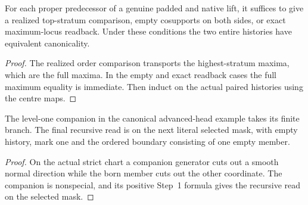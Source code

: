 \begin{theorem}
\label{hir:g1-later-positive-prefix-history}
\leanok
For each proper predecessor of a genuine padded and native
lift, it suffices to give a realized top-stratum comparison,
empty cosupports on both sides, or exact maximum-locus
readback. Under these conditions the two entire histories
have equivalent canonicality.
\end{theorem}
\begin{proof}
The realized order comparison transports the highest-stratum
maxima, which are the full maxima. In the empty and exact
readback cases the full maximum equality is immediate. Then
induct on the actual paired histories using the centre maps.
\end{proof}

\begin{theorem}
\label{hir:g1-joint-example-finite-born-leaf}
\leanok
The level-one companion in the canonical advanced-head example
takes its finite branch. The final recursive read is on the
next literal selected mask, with empty history, mark one and
the ordered boundary consisting of one empty member.
\end{theorem}
\begin{proof}
On the actual strict chart a companion generator cuts out a
smooth normal direction while the born member cuts out the
other coordinate. The companion is nonspecial, and its
positive Step~1 formula gives the recursive read on the
selected mask.
\end{proof}

